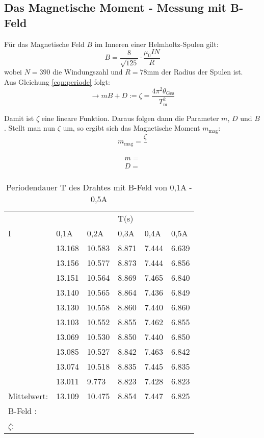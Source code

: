 \subsection{Das Magnetische Moment - Messung mit B-Feld}

Für das Magnetische Feld $B$ im Inneren einer Helmholtz-Spulen gilt:
\begin{equation}
    B= \frac{8}{\sqrt{125}} \cdot \frac{\mu_0 I N}{R}
\end{equation}
wobei $N=390$ die Windungszahl und $R=78$mm der Radius der Spulen ist.\\
Aus Gleichung \ref{eqn:periode}
folgt:
\begin{equation}
    \to mB+D := \zeta = \frac{4\pi^2\theta_\text{Ges}}{T^2_\text{m}}
\end{equation}

Damit ist $\zeta$ eine lineare Funktion. Daraus folgen dann die Parameter $m$, $D$ und $B$.
Stellt man nun $\zeta$ um, so ergibt sich das Magnetische Moment $m_\text{mag}$:
\begin{equation}
    m_\text{mag}=\frac{\zeta}{}    
\end{equation}

\begin{gather}
    m = \\
    D = \\
\end{gather}

\newpage
\begin{table}
    \centering
    \label{tab:tabelle_1}
    \begin{tabular}{p{3cm} | p{1.5cm} p{1.5cm} p{1.5cm} p{1.5cm} p{1.5cm}}
      &      &      & T(s) &      &     \\
    I & 0,1A & 0,2A & 0,3A & 0,4A & 0,5A\\
    \midrule
    & 13.168 & 10.583 & 8.871 &  7.444 &  6.639\\   
    & 13.156 & 10.577 & 8.873 &  7.444 &  6.856\\   
    & 13.151 & 10.564 & 8.869 &  7.465 &  6.840\\   
    & 13.140 & 10.565 & 8.864 &  7.436 &  6.849\\   
    & 13.130 & 10.558 & 8.860 &  7.440 &  6.860\\   
    & 13.103 & 10.552 & 8.855 &  7.462 &  6.855\\   
    & 13.069 & 10.530 & 8.850 &  7.440 &  6.850\\   
    & 13.085 & 10.527 & 8.842 & 7.463  &  6.842\\   
    & 13.074 & 10.518 & 8.835 &  7.445 &  6.835\\   
    & 13.011 & 9.773  & 8.823 &  7.428 &  6.823\\ 
    \midrule
    Mittelwert:    & 13.109 & 10.475 & 8.854 & 7.447 & 6.825 \\
    \midrule
    B-Feld : & & & & & \\
    $\zeta$: & & & & & \\
    \bottomrule
    \end{tabular}
    \caption{Periodendauer T des Drahtes mit B-Feld von 0,1A - 0,5A}
    \label{tab:tabelle_01A}
\end{table}

